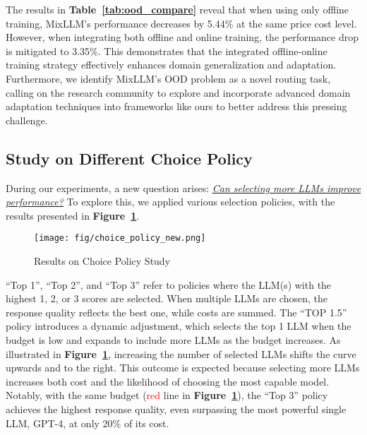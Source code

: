 \begin{table}[htbp]
\centering
\caption{Result on OOD Scenario}
\label{tab:ood_compare}
\end{table}

The results in \textbf{Table~\ref{tab:ood_compare}} reveal that when using only offline training, MixLLM's performance decreases by 5.44\% at the same price cost level. However, when integrating both offline and online training, the performance drop is mitigated to 3.35\%. This demonstrates that the integrated offline-online training strategy effectively enhances domain generalization and adaptation. 
Furthermore, we identify MixLLM's OOD problem as a novel routing task, calling on the research community to explore and incorporate advanced domain adaptation techniques into frameworks like ours to better address this pressing challenge.






\subsection{Study on Different Choice Policy}
\label{policy_study}
During our experiments, a new question arises: \ul{\textit{Can selecting more LLMs improve performance?}} To explore this, we applied various selection policies, with the results presented in \textbf{Figure~\ref{policy_result}}. 

\begin{figure}[htbp]
\centering
\texttt{[image: fig/choice\_policy\_new.png]}
\caption{Results on Choice Policy Study}
\label{policy_result}
\end{figure}

``Top 1'', ``Top 2'', and ``Top 3'' refer to policies where the LLM(s) with the highest 1, 2, or 3 scores are selected. When multiple LLMs are chosen, the response quality reflects the best one, while costs are summed. The ``TOP 1.5'' policy introduces a dynamic adjustment, which selects the top 1 LLM when the budget is low and expands to include more LLMs as the budget increases.
As illustrated in \textbf{Figure~\ref{policy_result}}, increasing the number of selected LLMs shifts the curve upwards and to the right. This outcome is expected because selecting more LLMs increases both cost and the likelihood of choosing the most capable model. Notably, with the same budget (\textcolor{red}{red} line in \textbf{Figure~\ref{policy_result}}), the ``Top 3'' policy achieves the highest response quality, even surpassing the most powerful single LLM, GPT-4, at only 20\% of its cost.

